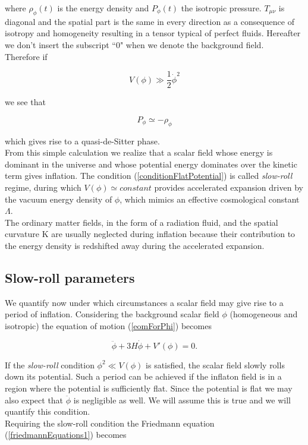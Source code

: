 \documentclass[11pt,a4paper,twoside]{book}
\begin{document}
where $ \rho_{\phi} (t) $ is the energy density and $ P_{\phi} (t) $ the isotropic pressure. $ T_{\mu\nu} $ is diagonal and the spatial part is the same in every direction as a consequence of isotropy and homogeneity resulting in a tensor typical of perfect fluids. Hereafter we don't insert the subscript \textquotedblleft 0" when we denote the background field. \\
Therefore if 

\begin{equation}
	\label{conditionFlatPotential}
	V(\phi) \gg \frac{1}{2} \dot{\phi}^{2}
\end{equation}

we see that 

\begin{equation}
	\label{deSitterCondition}
	P_{\phi} \simeq -\rho_{\phi}
\end{equation}

which gives rise to a quasi-de-Sitter phase.\\
From this simple calculation we realize that a scalar field whose energy is dominant in the universe and whose potential energy dominates over the kinetic term gives inflation. The condition (\ref{conditionFlatPotential}) is called \textit{slow-roll} regime, during which $ V(\phi) \simeq constant $ provides accelerated expansion driven by the vacuum energy density of $ \phi $, which mimics an effective cosmological constant $ \Lambda $.\\
The ordinary matter fields, in the form of a radiation fluid, and the spatial curvature K are usually neglected during inflation because their contribution to the energy density is redshifted away during the accelerated expansion.

\subsection{Slow-roll parameters}

We quantify now under which circumstances a scalar field may give rise to a period of inflation.
Considering the background scalar field $ \phi $ (homogeneous and isotropic) the equation of motion (\ref{eomForPhi}) becomes

\begin{equation}
	\label{eomHomogeneousField}
	\ddot{\phi} + 3H \dot{\phi} + V'(\phi) = 0.
\end{equation}

If the \textit{slow-roll} condition $ \phi^{2} \ll V(\phi) $ is satisfied, the scalar field slowly rolls down its potential. Such a period can be achieved if the inflaton field is in a region where the potential is sufficiently flat. Since the potential is flat we may also expect that $\ddot{\phi}$ is negligible as well. We will assume this is true and we will quantify this condition.\\
Requiring the slow-roll condition the Friedmann equation (\ref{friedmannEquations1}) becomes 
\end{document}
